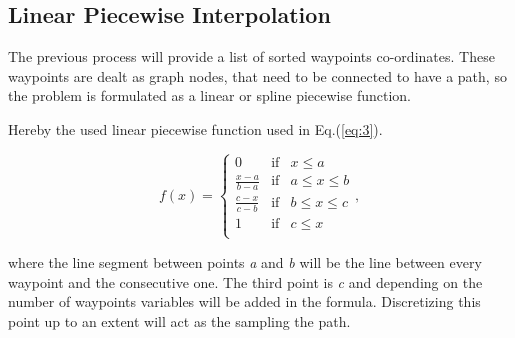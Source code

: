 \subsection{Linear Piecewise Interpolation}
The previous process will provide a list of sorted  waypoints co-ordinates. These waypoints are dealt as graph nodes, that need to be connected to have a path, so the problem is formulated as a linear or spline piecewise function.

 Hereby the used linear piecewise function used in Eq.(\ref{eq:3}).

\begin{equation} \label{eq:3}
f(x)=
\left\lbrace
\begin{array}{ccc}
0  & \mbox{if} & x\leq a\\
\frac{x-a}{b-a} & \mbox{if} & a\leq x\leq b \\
\frac{c-x}{c-b} & \mbox{if} & b\leq x\leq c \\
1  & \mbox{if} & c\leq  x \\
\end{array}\right.  ,
\end{equation}

\noindent where the line segment between points \textit{a} and \textit{b} will be the line between every waypoint and the consecutive one. The third point is \textit{c} and depending on the number of waypoints variables will be added in the formula. Discretizing this point up to an extent will act as the sampling the path. %
\vfill 

\hfill


